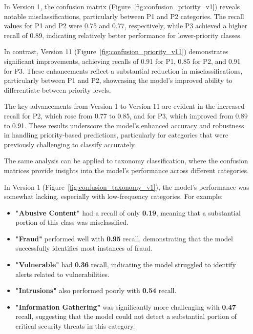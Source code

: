 In Version 1, the confusion matrix (Figure~\ref{fig:confusion_priority_v1}) reveals notable misclassifications, particularly between P1 and P2 categories. 
The recall values for P1 and P2 were 0.75 and 0.77, respectively, while P3 achieved a higher recall of 0.89, indicating relatively better performance for lower-priority classes. 

In contrast, Version 11 (Figure~\ref{fig:confusion_priority_v11}) demonstrates significant improvements, achieving recalls of 0.91 for P1, 0.85 for P2, and 0.91 for P3. 
These enhancements reflect a substantial reduction in misclassifications, particularly between P1 and P2, showcasing the model's improved ability to differentiate between priority levels. 

The key advancements from Version 1 to Version 11 are evident in the increased recall for P2, which rose from 0.77 to 0.85, and for P3, which improved from 0.89 to 0.91. 
These results underscore the model's enhanced accuracy and robustness in handling priority-based predictions, particularly for categories that were previously challenging to classify accurately.

The same analysis can be applied to taxonomy classification, where the confusion matrices provide insights into the model's performance across different categories.

In Version 1 (Figure~\ref{fig:confusion_taxonomy_v1}), the model's performance was somewhat lacking, especially with low-frequency categories. 
For example:

\begin{itemize}
    \item \textbf{"Abusive Content"} had a recall of only \textbf{0.19}, meaning that a substantial portion of this class was misclassified.
    \item \textbf{"Fraud"} performed well with \textbf{0.95} recall, demonstrating that the model successfully identifies most instances of fraud.
    \item \textbf{"Vulnerable"} had \textbf{0.36} recall, indicating the model struggled to identify alerts related to vulnerabilities.
    \item \textbf{"Intrusions"} also performed poorly with \textbf{0.54} recall.
    \item \textbf{"Information Gathering"} was significantly more challenging with \textbf{0.47} recall, suggesting that the model could not detect a substantial portion of critical security threats in this category.
\end{itemize}

